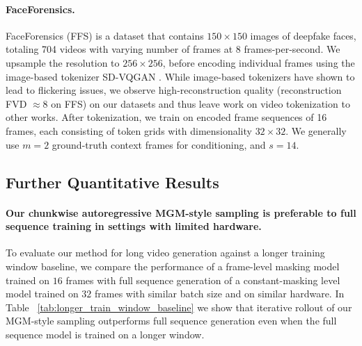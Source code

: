 \paragraph{FaceForensics.} FaceForensics (FFS) is a dataset that contains $150\times150$ images of deepfake faces, totaling 704 videos with varying number of frames at 8 frames-per-second. We upsample the resolution to $256 \times 256$, before encoding individual frames using the image-based tokenizer SD-VQGAN \cite{rombach2022high_latentdiffusion_ldm}. While image-based tokenizers have shown to lead to flickering issues, we observe high-reconstruction quality (reconstruction FVD $\approx 8$ on FFS) on our datasets and thus leave work on video tokenization to other works. After tokenization, we train on encoded frame sequences of 16 frames, each consisting of token grids with dimensionality $32 \times 32$. We generally use $m=2$ ground-truth context frames for conditioning, and $s=14$.

\subsection{Further Quantitative Results}

\paragraph{Our chunkwise autoregressive MGM-style sampling is preferable to full sequence training in settings with limited hardware.} To evaluate our method for long video generation against a longer training window baseline, we compare the performance of a frame-level masking model trained on $16$ frames with full sequence generation of a constant-masking level model trained on $32$ frames with similar batch size and on similar hardware. In Table ~\ref{tab:longer_train_window_baseline} we show that iterative rollout of our MGM-style sampling outperforms full sequence generation even when the full sequence model is trained on a longer window.


